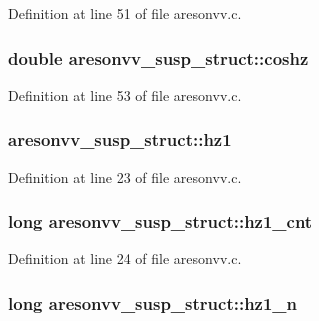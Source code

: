 Definition at line 51 of file aresonvv.\+c.

\subsubsection[{\texorpdfstring{coshz}{coshz}}]{\setlength{\rightskip}{0pt plus 5cm}double aresonvv\+\_\+susp\+\_\+struct\+::coshz}\hypertarget{structaresonvv__susp__struct_a97a10d0d2471eaa9fbf1c75f5d2c6d8d}{}\label{structaresonvv__susp__struct_a97a10d0d2471eaa9fbf1c75f5d2c6d8d}


Definition at line 53 of file aresonvv.\+c.

\subsubsection[{\texorpdfstring{hz1}{hz1}}]{ aresonvv\+\_\+susp\+\_\+struct\+::hz1}\hypertarget{structaresonvv__susp__struct_aa1ea5da9fdeb2d880de024445d405107}{}\label{structaresonvv__susp__struct_aa1ea5da9fdeb2d880de024445d405107}


Definition at line 23 of file aresonvv.\+c.

\subsubsection[{\texorpdfstring{hz1\+\_\+cnt}{hz1_cnt}}]{\setlength{\rightskip}{0pt plus 5cm}long aresonvv\+\_\+susp\+\_\+struct\+::hz1\+\_\+cnt}\hypertarget{structaresonvv__susp__struct_ab1fb22f923fce43e76e8aaed0ae1b8f0}{}\label{structaresonvv__susp__struct_ab1fb22f923fce43e76e8aaed0ae1b8f0}


Definition at line 24 of file aresonvv.\+c.

\subsubsection[{\texorpdfstring{hz1\+\_\+n}{hz1_n}}]{\setlength{\rightskip}{0pt plus 5cm}long aresonvv\+\_\+susp\+\_\+struct\+::hz1\+\_\+n}\hypertarget{structaresonvv__susp__struct_a2bf91612d7ae29a5d3fefd596273f05b}{}\label{structaresonvv__susp__struct_a2bf91612d7ae29a5d3fefd596273f05b}


